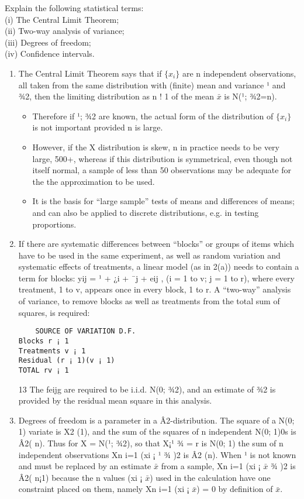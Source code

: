 \documentclass[a4paper,12pt]{article}
\begin{document}
\begin{framed}
\noindent Explain the following statistical terms:\\
(i) The Central Limit Theorem; \\
(ii) Two-way analysis of variance; \\
(iii) Degrees of freedom; \\ 
(iv) Confidence intervals.\\
\end{framed}

\begin{enumerate}
\item  The Central Limit Theorem says that if $\{x_i\}$ are n independent observations,
all taken from the same distribution with (finite) mean and variance ¹ and
¾2, then the limiting distribution as n ! 1 of the mean $\bar{x}$ is N(¹; ¾2=n).

\begin{itemize}
\item Therefore if ¹; ¾2 are known, the actual form of the distribution of $\{x_i\}$ is
not important provided n is large. 
\item However, if the X distribution is skew,
n in practice needs to be very large, 500+, whereas if this distribution is
symmetrical, even though not itself normal, a sample of less than 50 observations
may be adequate for the the approximation to be used.
\item It is the basis
for “large sample” tests of means and differences of means; and can also be
applied to discrete distributions, e.g. in testing proportions.
\end{itemize}

\item  If there are systematic differences between “blocks” or groups of items which
have to be used in the same experiment, as well as random variation and
systematic effects of treatments, a linear model (as in 2(a)) needs to contain
a term for blocks: yij = ¹ + ¿i + ¯j + eij , (i = 1 to v; j = 1 to r), where
every treatment, 1 to v, appears once in every block, 1 to r. A “two-way”
analysis of variance, to remove blocks as well as treatments from the total
sum of squares, is required:
\begin{verbatim}
    SOURCE OF VARIATION D.F.
Blocks r ¡ 1
Treatments v ¡ 1
Residual (r ¡ 1)(v ¡ 1)
TOTAL rv ¡ 1
\end{verbatim}

13
The feijg are required to be i.i.d. N(0; ¾2), and an estimate of ¾2 is provided
by the residual mean square in this analysis.
\item  Degrees of freedom is a parameter in a Â2-distribution. The square of a
N(0; 1) variate is X2
(1), and the sum of the squares of n independent N(0; 1)0s
is Â2(
n). Thus for X = N(¹; ¾2), so that X¡¹
¾ = r is N(0; 1) the sum of n
independent observations
Xn
i=1
(xi ¡ ¹
¾
)2 is Â2
(n). When ¹ is not known and
must be replaced by an estimate $\bar{x}$ from a sample,
Xn
i=1
(xi ¡ $\bar{x}$
¾
)2 is Â2(
n¡1)
because the n values (xi ¡ $\bar{x}$) used in the calculation have one constraint
placed on them, namely
Xn
i=1
(xi ¡ $\bar{x}$) = 0 by definition of $\bar{x}$. 


\end{enumerate}
\end{document}

